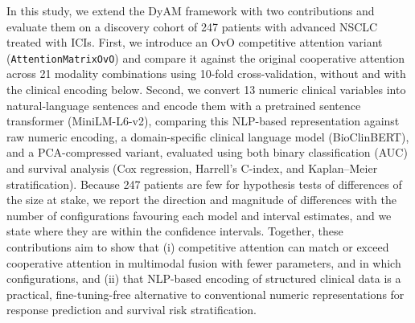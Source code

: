 In this study, we extend the DyAM framework with two contributions and
evaluate them on a discovery cohort of 247 patients with advanced NSCLC
treated with ICIs.
First, we introduce an OvO competitive attention variant
(\texttt{AttentionMatrixOvO}) and compare it against the original cooperative
attention across 21 modality combinations using 10-fold cross-validation,
without and with the clinical encoding below.
Second, we convert 13 numeric clinical variables into natural-language
sentences and encode them with a pretrained sentence transformer
(MiniLM-L6-v2), comparing this NLP-based representation against raw numeric
encoding, a domain-specific clinical language model (BioClinBERT), and a
PCA-compressed variant, evaluated using both binary classification (AUC) and
survival analysis (Cox regression, Harrell's C-index, and
Kaplan--Meier stratification).
Because 247 patients are few for hypothesis tests of differences of
the size at stake, we report the direction and magnitude of differences with the
number of configurations favouring each model and interval estimates,
and we state where they are within the confidence intervals.
Together, these contributions aim to show that (i) competitive attention can match or exceed
cooperative attention in multimodal fusion with fewer parameters, and in which configurations, and (ii) that NLP-based
encoding of structured clinical data is a practical, fine-tuning-free
alternative to conventional numeric representations for response prediction and
survival risk stratification.
